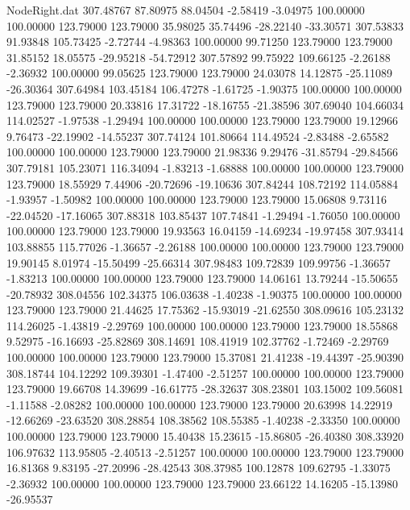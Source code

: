 \begin{filecontents}{NodeRight.dat}
 307.48767   87.80975   88.04504    -2.58419   -3.04975  100.00000  100.00000  123.79000  123.79000   35.98025   35.74496  -28.22140  -33.30571
 307.53833   91.93848  105.73425    -2.72744   -4.98363  100.00000   99.71250  123.79000  123.79000   31.85152   18.05575  -29.95218  -54.72912
 307.57892   99.75922  109.66125    -2.26188   -2.36932  100.00000   99.05625  123.79000  123.79000   24.03078   14.12875  -25.11089  -26.30364
 307.64984  103.45184  106.47278    -1.61725   -1.90375  100.00000  100.00000  123.79000  123.79000   20.33816   17.31722  -18.16755  -21.38596
 307.69040  104.66034  114.02527    -1.97538   -1.29494  100.00000  100.00000  123.79000  123.79000   19.12966    9.76473  -22.19902  -14.55237
 307.74124  101.80664  114.49524    -2.83488   -2.65582  100.00000  100.00000  123.79000  123.79000   21.98336    9.29476  -31.85794  -29.84566
 307.79181  105.23071  116.34094    -1.83213   -1.68888  100.00000  100.00000  123.79000  123.79000   18.55929    7.44906  -20.72696  -19.10636
 307.84244  108.72192  114.05884    -1.93957   -1.50982  100.00000  100.00000  123.79000  123.79000   15.06808    9.73116  -22.04520  -17.16065
 307.88318  103.85437  107.74841    -1.29494   -1.76050  100.00000  100.00000  123.79000  123.79000   19.93563   16.04159  -14.69234  -19.97458
 307.93414  103.88855  115.77026    -1.36657   -2.26188  100.00000  100.00000  123.79000  123.79000   19.90145    8.01974  -15.50499  -25.66314
 307.98483  109.72839  109.99756    -1.36657   -1.83213  100.00000  100.00000  123.79000  123.79000   14.06161   13.79244  -15.50655  -20.78932
 308.04556  102.34375  106.03638    -1.40238   -1.90375  100.00000  100.00000  123.79000  123.79000   21.44625   17.75362  -15.93019  -21.62550
 308.09616  105.23132  114.26025    -1.43819   -2.29769  100.00000  100.00000  123.79000  123.79000   18.55868    9.52975  -16.16693  -25.82869
 308.14691  108.41919  102.37762    -1.72469   -2.29769  100.00000  100.00000  123.79000  123.79000   15.37081   21.41238  -19.44397  -25.90390
 308.18744  104.12292  109.39301    -1.47400   -2.51257  100.00000  100.00000  123.79000  123.79000   19.66708   14.39699  -16.61775  -28.32637
 308.23801  103.15002  109.56081    -1.11588   -2.08282  100.00000  100.00000  123.79000  123.79000   20.63998   14.22919  -12.66269  -23.63520
 308.28854  108.38562  108.55385    -1.40238   -2.33350  100.00000  100.00000  123.79000  123.79000   15.40438   15.23615  -15.86805  -26.40380
 308.33920  106.97632  113.95805    -2.40513   -2.51257  100.00000  100.00000  123.79000  123.79000   16.81368    9.83195  -27.20996  -28.42543
 308.37985  100.12878  109.62795    -1.33075   -2.36932  100.00000  100.00000  123.79000  123.79000   23.66122   14.16205  -15.13980  -26.95537

\end{filecontents}

